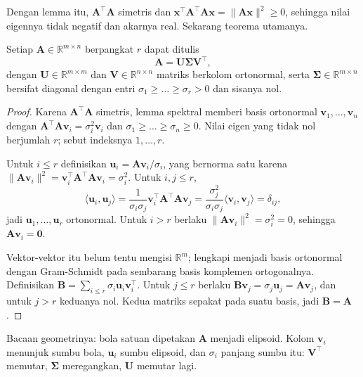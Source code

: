 Dengan lemma itu, $\mathbf{A}^{\top}\mathbf{A}$ simetris dan
$\mathbf{x}^{\top}\mathbf{A}^{\top}\mathbf{A}\mathbf{x}=\|\mathbf{A}\mathbf{x}\|^{2}\ge0$,
sehingga nilai eigennya tidak negatif dan akarnya real. Sekarang teorema utamanya.

\begin{teorema}
Setiap $\mathbf{A}\in\mathbb{R}^{m\times n}$ berpangkat $r$ dapat ditulis
\[
  \mathbf{A}=\mathbf{U}\boldsymbol{\Sigma}\mathbf{V}^{\top},
\]
dengan $\mathbf{U}\in\mathbb{R}^{m\times m}$ dan $\mathbf{V}\in\mathbb{R}^{n\times n}$
matriks berkolom ortonormal, serta $\boldsymbol{\Sigma}\in\mathbb{R}^{m\times n}$
bersifat diagonal dengan entri $\sigma_{1}\ge\dots\ge\sigma_{r}>0$ dan sisanya nol.
\end{teorema}

\begin{proof}
Karena $\mathbf{A}^{\top}\mathbf{A}$ simetris, lemma spektral memberi basis ortonormal
$\mathbf{v}_{1},\dots,\mathbf{v}_{n}$ dengan
$\mathbf{A}^{\top}\mathbf{A}\mathbf{v}_{i}=\sigma_{i}^{2}\mathbf{v}_{i}$ dan
$\sigma_{1}\ge\dots\ge\sigma_{n}\ge0$. Nilai eigen yang tidak nol berjumlah $r$;
sebut indeksnya $1,\dots,r$.

Untuk $i\le r$ definisikan $\mathbf{u}_{i}=\mathbf{A}\mathbf{v}_{i}/\sigma_{i}$, yang
bernorma satu karena $\|\mathbf{A}\mathbf{v}_{i}\|^{2}
=\mathbf{v}_{i}^{\top}\mathbf{A}^{\top}\mathbf{A}\mathbf{v}_{i}=\sigma_{i}^{2}$.
Untuk $i,j\le r$,
\[
  \langle\mathbf{u}_{i},\mathbf{u}_{j}\rangle
  =\frac{1}{\sigma_{i}\sigma_{j}}\mathbf{v}_{i}^{\top}\mathbf{A}^{\top}\mathbf{A}\mathbf{v}_{j}
  =\frac{\sigma_{j}^{2}}{\sigma_{i}\sigma_{j}}\langle\mathbf{v}_{i},\mathbf{v}_{j}\rangle
  =\delta_{ij},
\]
jadi $\mathbf{u}_{1},\dots,\mathbf{u}_{r}$ ortonormal. Untuk $i>r$ berlaku
$\|\mathbf{A}\mathbf{v}_{i}\|^{2}=\sigma_{i}^{2}=0$, sehingga $\mathbf{A}\mathbf{v}_{i}=\mathbf{0}$.

Vektor-vektor itu belum tentu mengisi $\mathbb{R}^{m}$; lengkapi menjadi basis ortonormal dengan
Gram-Schmidt pada sembarang basis komplemen ortogonalnya. Definisikan
$\mathbf{B}=\sum_{i\le r}\sigma_{i}\mathbf{u}_{i}\mathbf{v}_{i}^{\top}$. Untuk $j\le r$
berlaku $\mathbf{B}\mathbf{v}_{j}=\sigma_{j}\mathbf{u}_{j}=\mathbf{A}\mathbf{v}_{j}$, dan
untuk $j>r$ keduanya nol. Kedua matriks sepakat pada suatu basis, jadi $\mathbf{B}=\mathbf{A}$.
\end{proof}

Bacaan geometrinya: bola satuan dipetakan $\mathbf{A}$ menjadi elipsoid. Kolom
$\mathbf{v}_{i}$ menunjuk sumbu bola, $\mathbf{u}_{i}$ sumbu elipsoid, dan $\sigma_{i}$
panjang sumbu itu: $\mathbf{V}^{\top}$ memutar, $\boldsymbol{\Sigma}$ meregangkan,
$\mathbf{U}$ memutar lagi.

